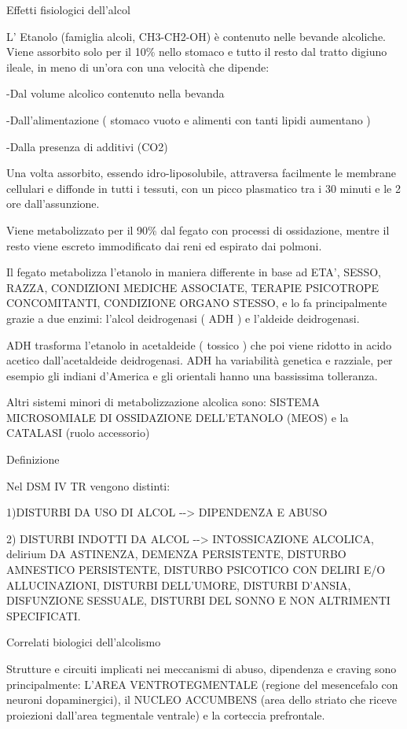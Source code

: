 \documentclass[]{article}
\begin{document}
Effetti fisiologici dell'alcol

L' Etanolo (famiglia alcoli, CH3-CH2-OH) è contenuto nelle bevande
alcoliche. Viene assorbito solo per il 10\% nello stomaco e tutto il
resto dal tratto digiuno ileale, in meno di un'ora con una velocità che
dipende:

-Dal volume alcolico contenuto nella bevanda

-Dall'alimentazione ( stomaco vuoto e alimenti con tanti lipidi
aumentano )

-Dalla presenza di additivi (CO2)

Una volta assorbito, essendo idro-liposolubile, attraversa facilmente le
membrane cellulari e diffonde in tutti i tessuti, con un picco
plasmatico tra i 30 minuti e le 2 ore dall'assunzione.

Viene metabolizzato per il 90\% dal fegato con processi di ossidazione,
mentre il resto viene escreto immodificato dai reni ed espirato dai
polmoni.

Il fegato metabolizza l'etanolo in maniera differente in base ad ETA',
SESSO, RAZZA, CONDIZIONI MEDICHE ASSOCIATE, TERAPIE PSICOTROPE
CONCOMITANTI, CONDIZIONE ORGANO STESSO, e lo fa principalmente grazie a
due enzimi: l'alcol deidrogenasi ( ADH ) e l'aldeide deidrogenasi.

ADH trasforma l'etanolo in acetaldeide ( tossico ) che poi viene ridotto
in acido acetico dall'acetaldeide deidrogenasi. ADH ha variabilità
genetica e razziale, per esempio gli indiani d'America e gli orientali
hanno una bassissima tolleranza.

Altri sistemi minori di metabolizzazione alcolica sono: SISTEMA
MICROSOMIALE DI OSSIDAZIONE DELL'ETANOLO (MEOS) e la CATALASI (ruolo
accessorio)

Definizione

Nel DSM IV TR vengono distinti:

1)DISTURBI DA USO DI ALCOL -\/-\textgreater{} DIPENDENZA E ABUSO

2) DISTURBI INDOTTI DA ALCOL -\/-\textgreater{} INTOSSICAZIONE ALCOLICA,
delirium DA ASTINENZA, DEMENZA PERSISTENTE, DISTURBO AMNESTICO
PERSISTENTE, DISTURBO PSICOTICO CON DELIRI E/O ALLUCINAZIONI, DISTURBI
DELL'UMORE, DISTURBI D'ANSIA, DISFUNZIONE SESSUALE, DISTURBI DEL SONNO E
NON ALTRIMENTI SPECIFICATI.

Correlati biologici dell'alcolismo

Strutture e circuiti implicati nei meccanismi di abuso, dipendenza e
craving sono principalmente: L'AREA VENTROTEGMENTALE (regione del
mesencefalo con neuroni dopaminergici), il NUCLEO ACCUMBENS (area dello
striato che riceve proiezioni dall'area tegmentale ventrale) e la
corteccia prefrontale.
\end{document}

